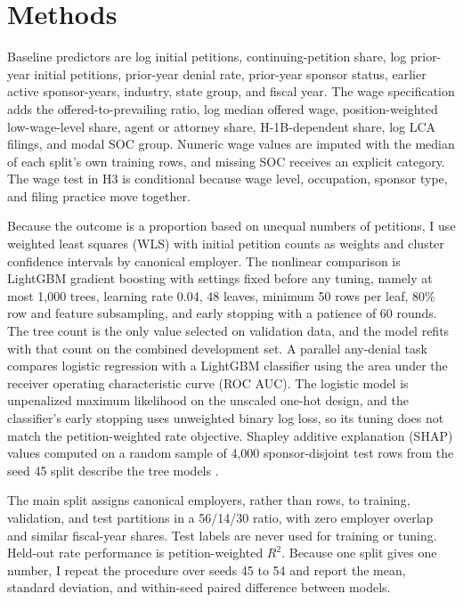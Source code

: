 \documentclass[9pt,twoside]{pnas-new}
\begin{document}
\section*{Methods}

Baseline predictors are log initial petitions, continuing-petition share, log prior-year initial petitions, prior-year denial rate, prior-year sponsor status, earlier active sponsor-years, industry, state group, and fiscal year. The wage specification adds the offered-to-prevailing ratio, log median offered wage, position-weighted low-wage-level share, agent or attorney share, H-1B-dependent share, log LCA filings, and modal SOC group. Numeric wage values are imputed with the median of each split's own training rows, and missing SOC receives an explicit category. The wage test in H3 is conditional because wage level, occupation, sponsor type, and filing practice move together.

Because the outcome is a proportion based on unequal numbers of petitions, I use weighted least squares (WLS) with initial petition counts as weights and cluster confidence intervals by canonical employer. The nonlinear comparison is LightGBM gradient boosting \cite{lightgbm2017} with settings fixed before any tuning, namely at most 1,000 trees, learning rate 0.04, 48 leaves, minimum 50 rows per leaf, 80\% row and feature subsampling, and early stopping with a patience of 60 rounds. The tree count is the only value selected on validation data, and the model refits with that count on the combined development set. A parallel any-denial task compares logistic regression with a LightGBM classifier using the area under the receiver operating characteristic curve (ROC AUC). The logistic model is unpenalized maximum likelihood on the unscaled one-hot design, and the classifier's early stopping uses unweighted binary log loss, so its tuning does not match the petition-weighted rate objective. Shapley additive explanation (SHAP) values computed on a random sample of 4,000 sponsor-disjoint test rows from the seed 45 split describe the tree models \cite{lundberg2017}.

The main split assigns canonical employers, rather than rows, to training, validation, and test partitions in a 56/14/30 ratio, with zero employer overlap and similar fiscal-year shares. Test labels are never used for training or tuning. Held-out rate performance is petition-weighted $R^2$. Because one split gives one number, I repeat the procedure over seeds 45 to 54 and report the mean, standard deviation, and within-seed paired difference between models.
\end{document}
